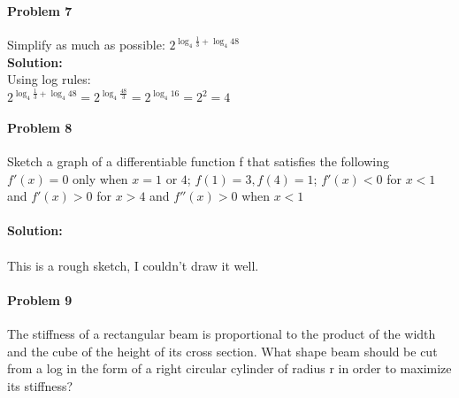 \documentclass[a4paper,11pt]{article}
\begin{document}
\paragraph{Problem 7} Simplify as much as possible:
$2^{\log_4{\frac{1}{3}+\log_4{48}}}$ \\
\textbf{Solution: } \\
Using log rules: \\
$2^{\log_4{\frac{1}{3}+\log_4{48}}} = 2^{\log_4{\frac{48}{3}}} = 2^{\log_4{16}} = 2^2 = 4$

\newpage

\paragraph{Problem 8} Sketch a graph of a differentiable function f that
satisfies the following $f ' (x) = 0$ only when $x = 1$ or $4$; $f(1) = 3,
f(4) = 1$; $f ' (x) < 0$ for $x < 1$ and $f ' (x) > 0$ for $x > 4$ and $f '' (x) > 0$ when $x < 1$ \\ \\
\textbf{Solution: } \\ \\
This is a rough sketch, I couldn't draw it well.
\begin{figure}[h]
\begin{center}
\end{center}
\end{figure}

\paragraph{Problem 9} The stiffness of a rectangular beam is proportional to
the product of the width and the cube of the height of its cross section.
What shape beam should be cut from a log in the form of a right circular
cylinder of radius r in order to maximize its stiffness? \\ \\
\end{document}

